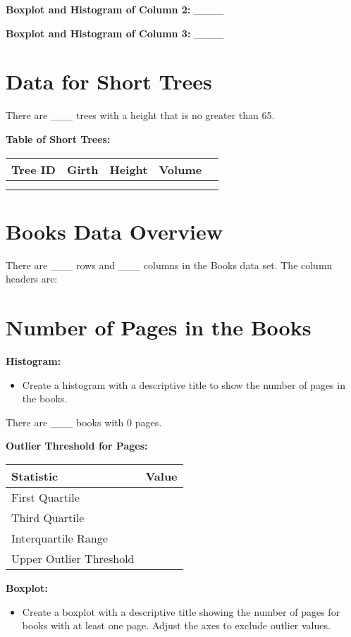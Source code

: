 \documentclass{article}
\begin{document}
\vspace{0.5cm}
\textbf{Boxplot and Histogram of Column 2:} \_\_\_\_

\vspace{0.5cm}
\textbf{Boxplot and Histogram of Column 3:} \_\_\_\_

\section*{Data for Short Trees}
There are \_\_\_ trees with a height that is no greater than 65. 

\vspace{0.5cm}

\textbf{Table of Short Trees:}

\begin{tabular}{@{}llccc@{}}
\toprule
Tree ID & Girth & Height & Volume \\ \midrule
        &       &        &        \\
        &       &        &        \\ \bottomrule
\end{tabular}

\vspace{1cm}

\section*{Books Data Overview}
There are \_\_\_ rows and \_\_\_ columns in the Books data set. The column headers are: 

\vspace{0.5cm}

\section*{Number of Pages in the Books}
\textbf{Histogram:}

\begin{itemize}
    \item Create a histogram with a descriptive title to show the number of pages in the books.
\end{itemize}

There are \_\_\_ books with 0 pages.

\vspace{0.5cm}

\textbf{Outlier Threshold for Pages:}
\begin{tabular}{@{}lc@{}}
\toprule
Statistic           & Value \\ \midrule
First Quartile      &       \\
Third Quartile      &       \\
Interquartile Range &       \\
Upper Outlier Threshold & \\ \bottomrule
\end{tabular}

\vspace{0.5cm}

\textbf{Boxplot:}
\begin{itemize}
    \item Create a boxplot with a descriptive title showing the number of pages for books with at least one page. Adjust the axes to exclude outlier values.
\end{itemize}
\end{document}
